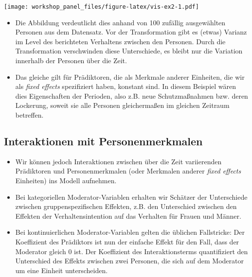 \documentclass[
]{book}
\newenvironment{Shaded}{\begin{snugshade}}{\end{snugshade}}
\newcommand{\DataTypeTok}[1]{\textcolor[rgb]{0.13,0.29,0.53}{#1}}
\newcommand{\DecValTok}[1]{\textcolor[rgb]{0.00,0.00,0.81}{#1}}
\newcommand{\KeywordTok}[1]{\textcolor[rgb]{0.13,0.29,0.53}{\textbf{#1}}}
\newcommand{\NormalTok}[1]{#1}
\newcommand{\OperatorTok}[1]{\textcolor[rgb]{0.81,0.36,0.00}{\textbf{#1}}}
\newcommand{\StringTok}[1]{\textcolor[rgb]{0.31,0.60,0.02}{#1}}
\providecommand{\tightlist}{%
  \setlength{\itemsep}{0pt}\setlength{\parskip}{0pt}}
\begin{document}
\texttt{[image: workshop\_panel\_files/figure-latex/vis-ex2-1.pdf]}

\begin{itemize}
\item
  Die Abbildung verdeutlicht dies anhand von 100 zufällig ausgewählten Personen aus dem Datensatz. Vor der Transformation gibt es (etwas) Varianz im Level des berichteten Verhaltens zwischen den Personen. Durch die Transformation verschwinden diese Unterschiede, es bleibt nur die Variation innerhalb der Personen über die Zeit.
\item
  Das gleiche gilt für Prädiktoren, die als Merkmale anderer Einheiten, die wir als \emph{fixed effects} spezifiziert haben, konstant sind. In diesem Beispiel wären dies Eigenschaften der Perioden, also z.B. neue Schutzmaßnahmen bzw. deren Lockerung, soweit sie alle Personen gleichermaßen im gleichen Zeitraum betreffen.
\end{itemize}

\hypertarget{interaktionen-mit-personenmerkmalen}{%
\subsection*{Interaktionen mit Personenmerkmalen}\label{interaktionen-mit-personenmerkmalen}}

\begin{itemize}
\tightlist
\item
  Wir können jedoch Interaktionen zwischen über die Zeit variierenden Prädiktoren und Personenmerkmalen (oder Merkmalen anderer \emph{fixed effects} Einheiten) ins Modell aufnehmen.
\item
  Bei kategoriellen Moderator-Variablen erhalten wir Schätzer der Unterschiede zwischen gruppenspezifischen Effekten, z.B. den Unterschied zwischen den Effekten der Verhaltensintention auf das Verhalten für Frauen und Männer.
\item
  Bei kontinuierlichen Moderator-Variablen gelten die üblichen Fallstricke: Der Koeffizient des Prädiktors ist nun der einfache Effekt für den Fall, dass der Moderator gleich 0 ist. Der Koeffizient des Interaktionsterms quantifiziert den Unterschied des Effekts zwischen zwei Personen, die sich auf dem Moderator um eine Einheit unterscheiden.
\end{itemize}

\begin{Shaded}
\end{Shaded}
\end{document}
